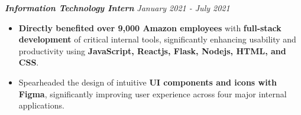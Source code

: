 \documentclass[10pt,a4paper]{article}
\begin{document}
{\fontsize{11}{12} \textbf{\textit{Information Technology Intern}}} \hfill \textit{January 2021 - July 2021}
\begin{itemize}[noitemsep]
    \item \textbf{Directly benefited over 9,000 Amazon employees} with \textbf{full-stack development} of critical internal tools, significantly enhancing usability and productivity using \textbf{JavaScript, Reactjs, Flask, Nodejs, HTML, and CSS}.
    \item Spearheaded the design of intuitive \textbf{UI components and icons with Figma}, significantly improving user experience across four major internal applications.
\end{itemize}

\end{document}

